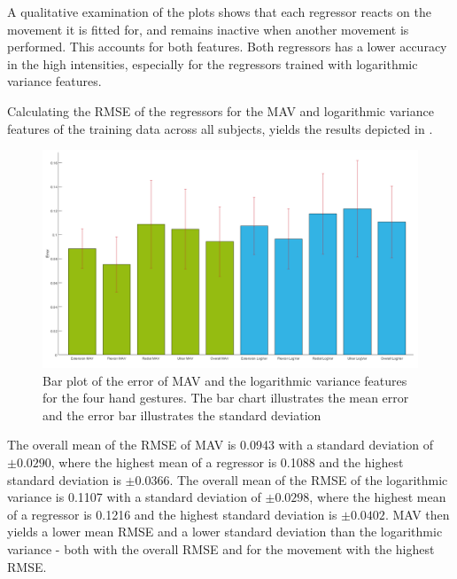 A qualitative examination of the plots shows that each regressor reacts on the movement it is fitted for, and remains inactive when another movement is performed. This accounts for both features. Both regressors has a lower accuracy in the high intensities, especially for the regressors trained with logarithmic variance features. 
  


Calculating the RMSE of the regressors for the MAV and logarithmic variance features of the training data across all subjects, yields the results depicted in . 

\begin{figure}[H]
	\includegraphics[width=.7\textwidth]{figures/results/gimmeThemRMSEBars}  %
	\caption{Bar plot of the error of MAV and the logarithmic variance features for the four hand gestures. The bar chart illustrates the mean error and the error bar illustrates the standard deviation}
	\label{fig:gimmeThemRMSEBars}  %
\end{figure}

The overall mean of the RMSE of MAV is 0.0943 with a standard deviation of $\pm 0.0290$, where the highest mean of a regressor is 0.1088 and the highest standard deviation is $\pm 0.0366$. The overall mean of the RMSE of the logarithmic variance is 0.1107 with a standard deviation of $\pm 0.0298$, where the highest mean of a regressor is 0.1216 and the highest standard deviation is $\pm 0.0402$. MAV then yields a lower mean RMSE and a lower standard deviation than the logarithmic variance - both with the overall RMSE and for the movement with the highest RMSE. 

